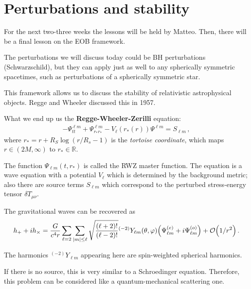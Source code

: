 \documentclass[main.tex]{subfiles}
\begin{document}
\section{Perturbations and stability}


For the next two-three weeks the lessons will be held by Matteo.
Then, there will be a final lesson on the EOB framework. 

The perturbations we will discuss today could be BH perturbations (Schwarzschild), but they can apply just as well to any spherically symmetric spacetimes, such as perturbations of a spherically symmetric star.  

This framework allows us to discuss the stability of relativistic astrophysical objects. 
Regge and Wheeler discussed this in 1957.

What we end up us the \textbf{Regge-Wheeler-Zerilli} equation:
%
\begin{align}
- \Psi_{tt}^{\ell m} + \Psi^{\ell m}_{r_* r_*} - V_\ell (r_* (r)) \Psi^{\ell m} = S_{\ell m}
\,,
\end{align}
%
where \(r_* = r + R_S \log (r / R_s - 1)\) is the \emph{tortoise coordinate}, which maps \(r \in (2M, \infty )\) to \(r_* \in \mathbb{R}\).

The function \(\Psi_{\ell m} (t, r_*)\) is called the RWZ master function. 
The equation is a wave equation with a potential \(V_\ell\) which is determined by the background metric; also there are source terms \(S_{\ell m}\) which correspond to the perturbed stress-energy tensor \(\delta T_{\mu \nu }\).

The gravitational waves can be recovered as 
%
\begin{align}
h_{+} + i h_{\times} = \frac{G}{c^{4} r} 
\sum _{\ell=2} \sum _{\abs{m} \leq \ell} \sqrt{\frac{(\ell+2)!}{(\ell-2)!}} {}^{(-2)} Y_{\ell m} (\theta , \varphi ) 
\qty(\Psi^{(e)}_{\ell m} + i\Psi^{(o)}_{\ell m}) + \order{1/r^2}
\,.
\end{align}

The harmonics \({}^{(-2)}Y_{\ell m}\) appearing here are spin-weighted spherical harmonics. 

If there is no source, this is very similar to a Schroedinger equation. 
Therefore, this problem can be considered like a quantum-mechanical scattering one. 
    
\end{document}
